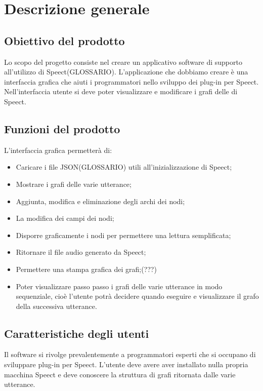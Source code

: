 \documentclass[../AnalisideiRequisiti.tex]{subfiles}
\begin{document}
	
\chapter{Descrizione generale}

\section{Obiettivo del prodotto}

Lo scopo del progetto consiste nel creare un applicativo software di supporto all’utilizzo di Speect(GLOSSARIO). L’applicazione che dobbiamo creare è una interfaccia grafica che aiuti i programmatori nello sviluppo dei plug-in per Speect. Nell’interfaccia utente si deve poter visualizzare e modificare i grafi delle  di Speect. 


\section{Funzioni del prodotto}
L’interfaccia grafica permetterà di:
\begin{itemize}
	\item{} Caricare i file JSON(GLOSSARIO) utili all’inizializzazione di Speect;
	\item{} Mostrare i grafi delle varie utterance;
	\item{} Aggiunta, modifica e eliminazione degli archi dei nodi; 
	\item{} La modifica dei campi dei nodi;
	\item{} Disporre graficamente i nodi per permettere una lettura semplificata;
	\item{} Ritornare il file audio generato da Speect;
	\item{} Permettere una stampa grafica dei grafi;(???)
	\item{} Poter visualizzare passo passo i grafi delle varie utterance in modo sequenziale, cioè l’utente potrà decidere quando eseguire e visualizzare il grafo della successiva utterance.	
\end{itemize}


\section{Caratteristiche degli utenti}
Il software si rivolge prevalentemente a programmatori esperti che si occupano di sviluppare plug-in per Speect. L’utente deve avere aver installato nulla propria macchina Speect e deve conoscere la struttura di grafi ritornata dalle varie utterance.
\end{document}
